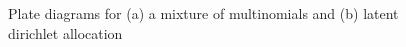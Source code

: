 %
%
%
%
%
%
%


\begin{figure}[t]
\centering
    \subfigure[]{
        \resizebox{4cm}{!}{
            
        }
    }
    \subfigure[]{
        \resizebox{4cm}{!}{
            
        }
    }
    \caption{Plate diagrams for (a) a mixture of multinomials and (b) latent dirichlet allocation}
\label{fig:plates}
\end{figure}

